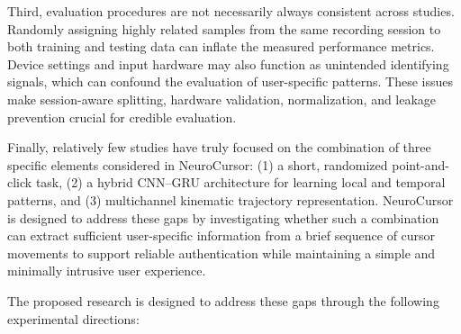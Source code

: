 \documentclass[conference]{IEEEtran}
\begin{document}
Third, evaluation procedures are not necessarily always consistent across studies. Randomly assigning highly related samples from the same recording session to both training and testing data can inflate the measured performance metrics. Device settings and input hardware may also function as unintended identifying signals, which can confound the evaluation of user-specific patterns. These issues make session-aware splitting, hardware validation, normalization, and leakage prevention crucial for credible evaluation.

Finally, relatively few studies have truly focused on the combination of three specific elements considered in NeuroCursor: (1) a short, randomized point-and-click task, (2) a hybrid CNN--GRU architecture for learning local and temporal patterns, and (3) multichannel kinematic trajectory representation. NeuroCursor is designed to address these gaps by investigating whether such a combination can extract sufficient user-specific information from a brief sequence of cursor movements to support reliable authentication while maintaining a simple and minimally intrusive user experience.

The proposed research is designed to address these gaps through the following experimental directions:
\end{document}
